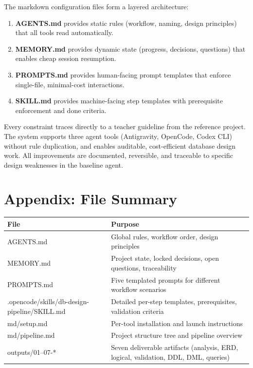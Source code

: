 \documentclass[12pt,a4paper]{article}
\begin{document}
The markdown configuration files form a layered architecture:
\begin{enumerate}
    \item \textbf{AGENTS.md} provides static rules (workflow, naming, design principles) that all tools read automatically.
    \item \textbf{MEMORY.md} provides dynamic state (progress, decisions, questions) that enables cheap session resumption.
    \item \textbf{PROMPTS.md} provides human-facing prompt templates that enforce single-file, minimal-cost interactions.
    \item \textbf{SKILL.md} provides machine-facing step templates with prerequisite enforcement and done criteria.
\end{enumerate}

Every constraint traces directly to a teacher guideline from the reference project. The system supports three agent tools (Antigravity, OpenCode, Codex CLI) without rule duplication, and enables auditable, cost-efficient database design work. All improvements are documented, reversible, and traceable to specific design weaknesses in the baseline agent.

\section*{Appendix: File Summary}

\begin{table}[h]
\centering
\begin{tabular}{|l|p{6cm}|}
\hline
\textbf{File} & \textbf{Purpose} \\
\hline
AGENTS.md & Global rules, workflow order, design principles \\
\hline
MEMORY.md & Project state, locked decisions, open questions, traceability \\
\hline
PROMPTS.md & Five templated prompts for different workflow scenarios \\
\hline
.opencode/skills/db-design-pipeline/SKILL.md & Detailed per-step templates, prerequisites, validation criteria \\
\hline
md/setup.md & Per-tool installation and launch instructions \\
\hline
md/pipeline.md & Project structure tree and pipeline overview \\
\hline
outputs/01--07-* & Seven deliverable artifacts (analysis, ERD, logical, validation, DDL, DML, queries) \\
\hline
\end{tabular}
\end{table}
\end{document}
